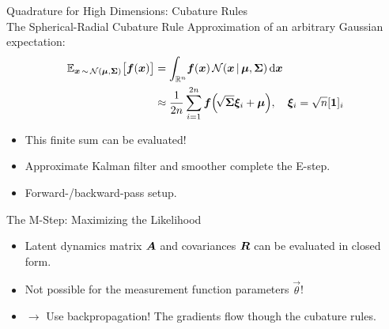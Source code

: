 \documentclass[
	aspectratio=43,
	color={accentcolor=1c},
	logo=false,
	colorframetitle=true,
]{tudabeamer}
\begin{document}
	\begin{frame}{Quadrature for High Dimensions: Cubature Rules \\ The Spherical-Radial Cubature Rule}
		Approximation of an arbitrary Gaussian expectation:
		\begin{align*}
			\mathbb{E}_{\bm{x} \,\sim\, \mathcal{N}(\bm{\mu}, \bm{\Sigma})}\big[ \bm{f}(\bm{x}) \big]
				&= \int_{\mathbb{R}^n} \! \bm{f}(\bm{x}) \, \mathcal{N}(\bm{x} \,\vert\, \bm{\mu}, \bm{\Sigma}) \dd{\bm{x}} \\
				&\approx \frac{1}{2n} \sum_{i = 1}^{2n} \bm{f}\Big(\! \sqrt{\bm{\Sigma}} \bm{\xi}_i + \bm{\mu} \Big),\quad \bm{\xi}_i = \sqrt{n} [\bm{1}]_i
		\end{align*}
		\begin{itemize}
			\item This finite sum can be evaluated!
			\item Approximate Kalman filter and smoother complete the E-step.
			\item Forward-/backward-pass setup.
		\end{itemize}
	\end{frame}

	\begin{frame}{The M-Step: Maximizing the Likelihood}
		\begin{itemize}
			\item Latent dynamics matrix \(\bm{A}\) and covariances \(\bm{R}\) can be evaluated in closed form.
			\item Not possible for the measurement function parameters \( \vec{\theta} \)!
			\item[] \(\longrightarrow\) Use backpropagation! The gradients flow though the cubature rules.
		\end{itemize}
	\end{frame}


%		
\end{document}
